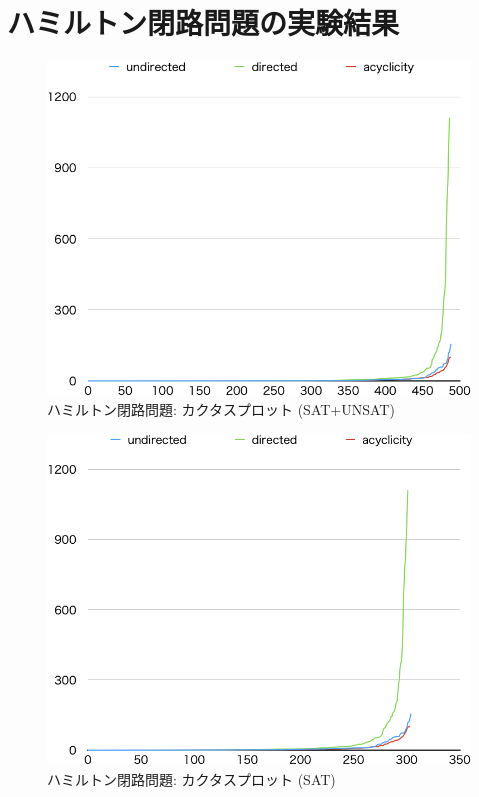 \section{ハミルトン閉路問題の実験結果}


\begin{figure}[tb]
\begin{center}
  \includegraphics[width=0.6\linewidth]{fig/cactus.png}
\caption{ハミルトン閉路問題: カクタスプロット (\textsf{SAT+UNSAT})}
\label{cactus}
\end{center}
\end{figure}

\begin{figure}[tb]
\begin{center}
  \includegraphics[width=0.6\linewidth]{fig/cactussat.png}
\caption{ハミルトン閉路問題: カクタスプロット (\textsf{SAT})}
\label{cactussat}
\end{center}
\end{figure}

